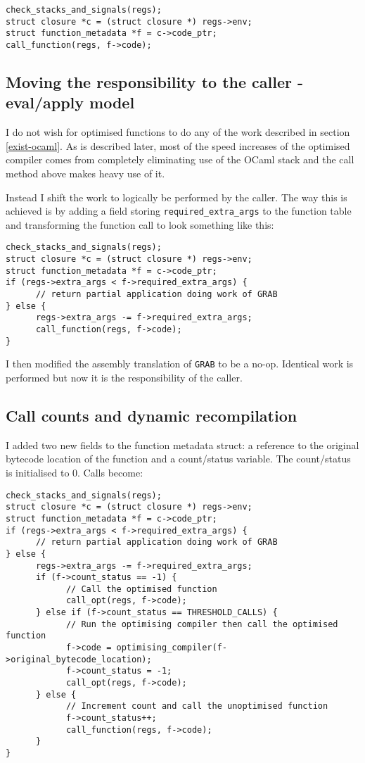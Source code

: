 \begin{verbatim}
check_stacks_and_signals(regs);
struct closure *c = (struct closure *) regs->env;
struct function_metadata *f = c->code_ptr;
call_function(regs, f->code);
\end{verbatim}

\subsection{Moving the responsibility to the caller - eval/apply model}

I do not wish for optimised functions to do any of the work described in section \ref{exist-ocaml}.
As is described later, most of the speed increases of the optimised compiler comes from completely
eliminating use of the OCaml stack and the call method above makes heavy use of it.

Instead I shift the work to logically be performed by the caller. The way this is achieved is by
adding a
field storing \texttt{required\_extra\_args} to the function table and transforming the function
call to look something like this:

\begin{verbatim}
check_stacks_and_signals(regs);
struct closure *c = (struct closure *) regs->env;
struct function_metadata *f = c->code_ptr;
if (regs->extra_args < f->required_extra_args) {
      // return partial application doing work of GRAB
} else {
      regs->extra_args -= f->required_extra_args;
      call_function(regs, f->code);
}
\end{verbatim}

I then modified the assembly translation of \texttt{GRAB} to be a no-op. Identical work is
performed but now it is the responsibility of the caller.

\subsection{Call counts and dynamic recompilation} \label{final-call-logic}

I added two new fields to the function metadata struct: a reference to the original bytecode
location
of the function and a count/status variable.  The count/status is initialised to 0. Calls become:

\begin{verbatim}
check_stacks_and_signals(regs);
struct closure *c = (struct closure *) regs->env;
struct function_metadata *f = c->code_ptr;
if (regs->extra_args < f->required_extra_args) {
      // return partial application doing work of GRAB
} else { 
      regs->extra_args -= f->required_extra_args;
      if (f->count_status == -1) {
            // Call the optimised function
            call_opt(regs, f->code);
      } else if (f->count_status == THRESHOLD_CALLS) {
            // Run the optimising compiler then call the optimised function
            f->code = optimising_compiler(f->original_bytecode_location);
            f->count_status = -1;
            call_opt(regs, f->code);
      } else {
            // Increment count and call the unoptimised function 
            f->count_status++;
            call_function(regs, f->code);
      }
}
\end{verbatim}

